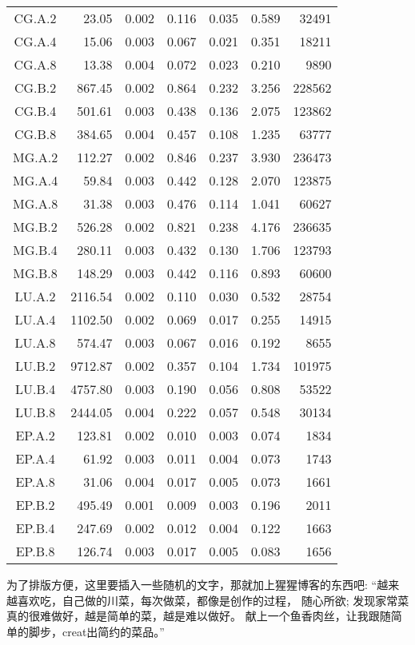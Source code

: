 \begin{longtable}[c]{c*{6}{r}}
\endfoot%
\endlastfoot%
CG.A.2 & 23.05   & 0.002 & 0.116 & 0.035 & 0.589 & 32491  \\
CG.A.4 & 15.06   & 0.003 & 0.067 & 0.021 & 0.351 & 18211  \\
CG.A.8 & 13.38   & 0.004 & 0.072 & 0.023 & 0.210 & 9890   \\
CG.B.2 & 867.45  & 0.002 & 0.864 & 0.232 & 3.256 & 228562 \\
CG.B.4 & 501.61  & 0.003 & 0.438 & 0.136 & 2.075 & 123862 \\
CG.B.8 & 384.65  & 0.004 & 0.457 & 0.108 & 1.235 & 63777  \\
MG.A.2 & 112.27  & 0.002 & 0.846 & 0.237 & 3.930 & 236473 \\
MG.A.4 & 59.84   & 0.003 & 0.442 & 0.128 & 2.070 & 123875 \\
MG.A.8 & 31.38   & 0.003 & 0.476 & 0.114 & 1.041 & 60627  \\
MG.B.2 & 526.28  & 0.002 & 0.821 & 0.238 & 4.176 & 236635 \\
MG.B.4 & 280.11  & 0.003 & 0.432 & 0.130 & 1.706 & 123793 \\
MG.B.8 & 148.29  & 0.003 & 0.442 & 0.116 & 0.893 & 60600  \\
LU.A.2 & 2116.54 & 0.002 & 0.110 & 0.030 & 0.532 & 28754  \\
LU.A.4 & 1102.50 & 0.002 & 0.069 & 0.017 & 0.255 & 14915  \\
LU.A.8 & 574.47  & 0.003 & 0.067 & 0.016 & 0.192 & 8655   \\
LU.B.2 & 9712.87 & 0.002 & 0.357 & 0.104 & 1.734 & 101975 \\
LU.B.4 & 4757.80 & 0.003 & 0.190 & 0.056 & 0.808 & 53522  \\
LU.B.8 & 2444.05 & 0.004 & 0.222 & 0.057 & 0.548 & 30134  \\
EP.A.2 & 123.81  & 0.002 & 0.010 & 0.003 & 0.074 & 1834   \\
EP.A.4 & 61.92   & 0.003 & 0.011 & 0.004 & 0.073 & 1743   \\
EP.A.8 & 31.06   & 0.004 & 0.017 & 0.005 & 0.073 & 1661   \\
EP.B.2 & 495.49  & 0.001 & 0.009 & 0.003 & 0.196 & 2011   \\
EP.B.4 & 247.69  & 0.002 & 0.012 & 0.004 & 0.122 & 1663   \\
EP.B.8 & 126.74  & 0.003 & 0.017 & 0.005 & 0.083 & 1656   \\
\bottomrule[1.5pt]
\end{longtable}

为了排版方便，这里要插入一些随机的文字，那就加上猩猩博客的东西吧: 
``越来越喜欢吃，自己做的川菜，每次做菜，都像是创作的过程，%
随心所欲; 发现家常菜真的很难做好，越是简单的菜，越是难以做好。
献上一个鱼香肉丝，让我跟随简单的脚步，creat出简约的菜品。''

